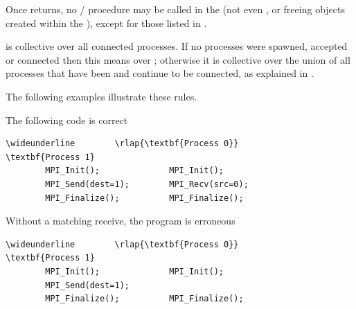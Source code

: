 Once  returns, no \MPI/ procedure may be called in the \wpm{}
(not even , or freeing objects created within the \wpm{}),
except for those listed in .

 is collective over all connected processes.
If no processes were spawned, accepted or connected then this means
over ; otherwise it is collective over the
union of all processes that have been and continue to be connected,
as explained in .

The following examples illustrate these rules.

\begin{example}
%
The following code is correct

\begin{Verbatim}[commandchars=\\\{\}]
\wideunderline        \rlap{\textbf{Process 0}}                         \textbf{Process 1}
        MPI_Init();              MPI_Init();
        MPI_Send(dest=1);        MPI_Recv(src=0);
        MPI_Finalize();          MPI_Finalize();
\end{Verbatim}
\lstset{fancyvrb=false}
\end{example}

\begin{example}
%
Without a matching receive, the program is erroneous
\begin{Verbatim}[commandchars=\\\{\}]
\wideunderline        \rlap{\textbf{Process 0}}                         \textbf{Process 1}
        MPI_Init();              MPI_Init();
        MPI_Send(dest=1);
        MPI_Finalize();          MPI_Finalize();
\end{Verbatim}
\lstset{fancyvrb=false}
\end{example}


